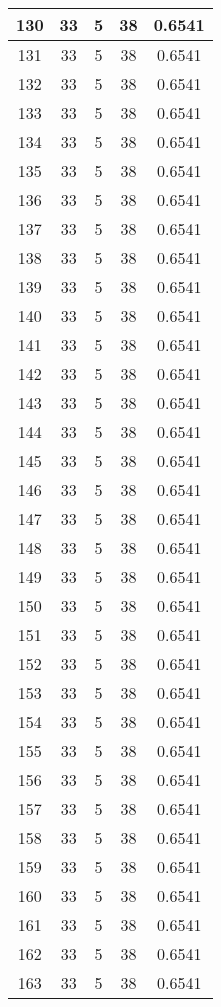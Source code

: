 \documentclass[letterpaper, 12pt]{article}
\begin{document}
\begin{longtable}{|c|c|c|c|c|}
\hline
130 & 33 & 5 & 38 & 0.6541 \\
\hline
131 & 33 & 5 & 38 & 0.6541 \\
\hline
132 & 33 & 5 & 38 & 0.6541 \\
\hline
133 & 33 & 5 & 38 & 0.6541 \\
\hline
134 & 33 & 5 & 38 & 0.6541 \\
\hline
135 & 33 & 5 & 38 & 0.6541 \\
\hline
136 & 33 & 5 & 38 & 0.6541 \\
\hline
137 & 33 & 5 & 38 & 0.6541 \\
\hline
138 & 33 & 5 & 38 & 0.6541 \\
\hline
139 & 33 & 5 & 38 & 0.6541 \\
\hline
140 & 33 & 5 & 38 & 0.6541 \\
\hline
141 & 33 & 5 & 38 & 0.6541 \\
\hline
142 & 33 & 5 & 38 & 0.6541 \\
\hline
143 & 33 & 5 & 38 & 0.6541 \\
\hline
144 & 33 & 5 & 38 & 0.6541 \\
\hline
145 & 33 & 5 & 38 & 0.6541 \\
\hline
146 & 33 & 5 & 38 & 0.6541 \\
\hline
147 & 33 & 5 & 38 & 0.6541 \\
\hline
148 & 33 & 5 & 38 & 0.6541 \\
\hline
149 & 33 & 5 & 38 & 0.6541 \\
\hline
150 & 33 & 5 & 38 & 0.6541 \\
\hline
151 & 33 & 5 & 38 & 0.6541 \\
\hline
152 & 33 & 5 & 38 & 0.6541 \\
\hline
153 & 33 & 5 & 38 & 0.6541 \\
\hline
154 & 33 & 5 & 38 & 0.6541 \\
\hline
155 & 33 & 5 & 38 & 0.6541 \\
\hline
156 & 33 & 5 & 38 & 0.6541 \\
\hline
157 & 33 & 5 & 38 & 0.6541 \\
\hline
158 & 33 & 5 & 38 & 0.6541 \\
\hline
159 & 33 & 5 & 38 & 0.6541 \\
\hline
160 & 33 & 5 & 38 & 0.6541 \\
\hline
161 & 33 & 5 & 38 & 0.6541 \\
\hline
162 & 33 & 5 & 38 & 0.6541 \\
\hline
163 & 33 & 5 & 38 & 0.6541 \\

\end{longtable}
\end{document}
